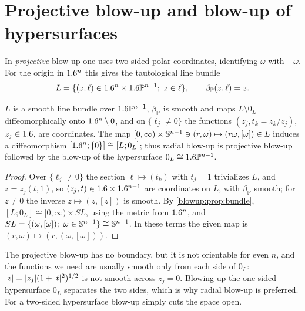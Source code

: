 \section{Projective blow-up and blow-up of hypersurfaces}\label{blowup:sec:projective}

In \emph{projective} blow-up one uses two-sided polar coordinates, identifying $\omega$
with $-\omega$. For the origin in $1.6^n$ this gives the tautological line bundle
\begin{equation*}
  L=\{(z,\ell)\in\R^n\times\R\mathbb P^{n-1};\ z\in\ell\},\qquad\beta_{\mathbb P}(z,\ell)=z.
\end{equation*}

\begin{proposition}\label{blowup:prop:projective}
$L$ is a smooth line bundle over $1.6\mathbb P^{n-1}$, $\beta_{\mathbb P}$ is smooth and maps
$L\setminus0_L$ diffeomorphically onto $1.6^n\setminus0$, and on $\{\ell_j\ne0\}$ the functions
$(z_j,t_k=z_k/z_j)$, $z_j\in1.6$, are coordinates. The map
$[0,\infty)\times\mathbb{S}^{n-1}\ni(r,\omega)\mapsto(r\omega,[\omega])\in L$ induces a
diffeomorphism $[1.6^n;\{0\}]\cong[L;0_L]$; thus radial blow-up is projective blow-up
followed by the blow-up of the hypersurface $0_L\cong1.6\mathbb P^{n-1}$.
\end{proposition}
\begin{proof}
Over $\{\ell_j\ne0\}$ the section $\ell\mapsto(t_k)$ with $t_j=1$ trivializes $L$, and
$z=z_j(t,1)$, so $(z_j,t)\in1.6\times1.6^{n-1}$ are coordinates on $L$, with $\beta_{\mathbb P}$
smooth; for $z\ne0$ the inverse $z\mapsto(z,[z])$ is smooth. By
\cref{blowup:prop:bundle}, $[L;0_L]\cong[0,\infty)\times SL$, using the metric from $1.6^n$,
and $SL=\{(\omega,[\omega]);\ \omega\in\Sphere^{n-1}\}\cong\Sphere^{n-1}$. In these terms the
given map is $(r,\omega)\mapsto(r,(\omega,[\omega]))$.
\end{proof}

The projective blow-up has no boundary, but it is not orientable for even $n$, and the
functions we need are usually smooth only from each side of $0_L$: $\lvert z\rvert=\lvert z_j\rvert(1+\lvert t\rvert^2)^{1/2}$ is not smooth across $z_j=0$. Blowing up the one-sided hypersurface $0_L$
separates the two sides, which is why radial blow-up is preferred. For a two-sided
hypersurface blow-up simply cuts the space open.

